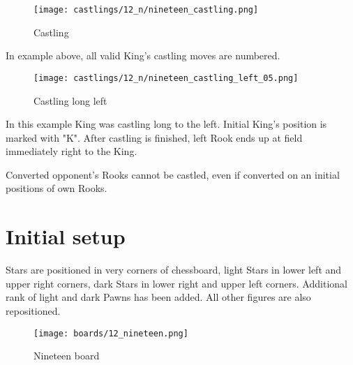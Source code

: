 \noindent
\begin{figure}[!h]
\texttt{[image: castlings/12\_n/nineteen\_castling.png]}
\caption{Castling}
\label{fig:nineteen_castling}
\end{figure}

In example above, all valid King's castling moves are numbered.

\noindent
\begin{figure}[!h]
\texttt{[image: castlings/12\_n/nineteen\_castling\_left\_05.png]}
\caption{Castling long left}
\label{fig:nineteen_castling_left_05}
\end{figure}

In this example King was castling long to the left. Initial King's position is marked with "K".
After castling is finished, left Rook ends up at field immediately right to the King.

Converted opponent's Rooks cannot be castled, even if converted on an initial positions
of own Rooks.

\clearpage %

\section*{Initial setup}

Stars are positioned in very corners of chessboard, light Stars in lower left and upper right
corners, dark Stars in lower right and upper left corners. Additional rank of light and dark
Pawns has been added. All other figures are also repositioned.

\noindent
\begin{figure}[h]
\texttt{[image: boards/12\_nineteen.png]}
\caption{Nineteen board}
\label{fig:12_nineteen}
\end{figure}

\clearpage %
